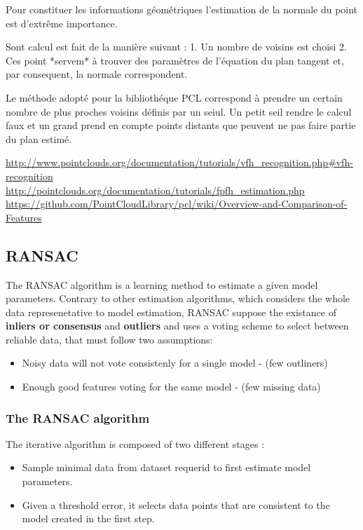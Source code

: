 Pour constituer les informations géométriques l'estimation de la normale du point est d'extrême importance. 

Sont calcul est fait de la manière suivant :
1. Un nombre de voisins est choisi 
2. Ces point *servem* à trouver des paramètres de l'équation du plan tangent et, par consequent, la normale correspondent.

Le méthode adopté pour la bibliothéque PCL correspond à prendre un certain nombre de plus proches voisins définis par un seiul. Un petit seil rendre le calcul faux et un grand prend en compte points distants que peuvent ne pas faire partie du plan estimé.

\url{http://www.pointclouds.org/documentation/tutorials/vfh_recognition.php#vfh-recognition} \\

\url{http://pointclouds.org/documentation/tutorials/fpfh_estimation.php} \\

\url{https://github.com/PointCloudLibrary/pcl/wiki/Overview-and-Comparison-of-Features} \\

\subsection { RANSAC } 

The RANSAC algorithm is a learning method to estimate a given model parameters. Contrary to other estimation algorithms, which considers the whole data represenetative to model estimation, RANSAC suppose the existance of \textbf{inliers or consensus} and \textbf{outliers}  and uses a voting scheme to select between reliable data, that must follow two assumptions: 

\begin{itemize}
\item Noisy data will not vote consistenly for a single model - (few outliners) 
\item Enough good features voting for the same model - (few missing data)
\end{itemize}

\subsubsection{The RANSAC algorithm}

The iterative algorithm is composed of two different stages : 
\begin {itemize}
\item Sample minimal data from dataset requerid to first estimate model parameters.
\item Given a threshold error, it selects data points that are consistent to the model created in the first step.
\end {itemize}

